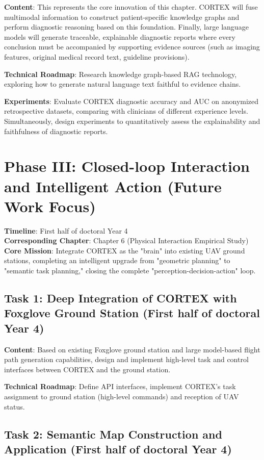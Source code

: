 \textbf{Content}: This represents the core innovation of this chapter. CORTEX will fuse multimodal information to construct patient-specific knowledge graphs and perform diagnostic reasoning based on this foundation. Finally, large language models will generate traceable, explainable diagnostic reports where every conclusion must be accompanied by supporting evidence sources (such as imaging features, original medical record text, guideline provisions).

\textbf{Technical Roadmap}: Research knowledge graph-based RAG technology, exploring how to generate natural language text faithful to evidence chains.

\textbf{Experiments}: Evaluate CORTEX diagnostic accuracy and AUC on anonymized retrospective datasets, comparing with clinicians of different experience levels. Simultaneously, design experiments to quantitatively assess the explainability and faithfulness of diagnostic reports.

\section{Phase III: Closed-loop Interaction and Intelligent Action (Future Work Focus)}

\textbf{Timeline}: First half of doctoral Year 4\\
\textbf{Corresponding Chapter}: Chapter 6 (Physical Interaction Empirical Study)\\
\textbf{Core Mission}: Integrate CORTEX as the "brain" into existing UAV ground stations, completing an intelligent upgrade from "geometric planning" to "semantic task planning," closing the complete "perception-decision-action" loop.

\subsection{Task 1: Deep Integration of CORTEX with Foxglove Ground Station (First half of doctoral Year 4)}

\textbf{Content}: Based on existing Foxglove ground station and large model-based flight path generation capabilities, design and implement high-level task and control interfaces between CORTEX and the ground station.

\textbf{Technical Roadmap}: Define API interfaces, implement CORTEX's task assignment to ground station (high-level commands) and reception of UAV status.

\subsection{Task 2: Semantic Map Construction and Application (First half of doctoral Year 4)}

